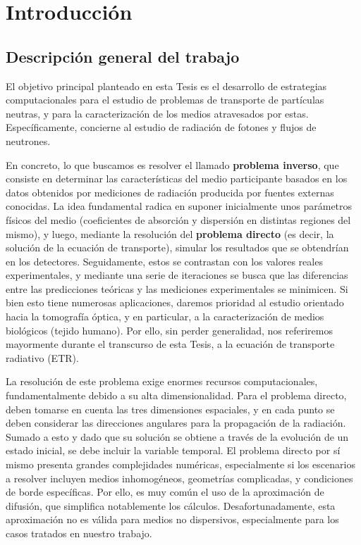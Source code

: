 
\pagestyle{fancy}
\lhead{\thepage}
\chapter{Introducción}
\vspace{0.01\textheight}


\clearpage \pagebreak  \section{Descripción general del trabajo}  

El objetivo principal planteado en esta Tesis es el desarrollo 
de estrategias computacionales para el 
estudio de problemas de transporte de partículas neutras, y para la 
caracterización de los medios atravesados por estas.
Específicamente, concierne al estudio de radiación de fotones y 
flujos de neutrones.

En concreto, lo que buscamos es resolver el llamado  
{\bf problema inverso}, que consiste en determinar las características 
del medio participante basados en los datos obtenidos por mediciones 
de radiación producida por fuentes externas conocidas.
La idea fundamental radica en suponer inicialmente unos parámetros 
físicos del medio (coeficientes de absorción y dispersión en distintas 
regiones del mismo), y luego, mediante la resolución del {\bf problema 
directo} (es decir, la solución de la ecuación de transporte), 
simular los resultados que se obtendrían en los detectores. 
Seguidamente, estos se contrastan con los valores reales experimentales, 
y mediante una serie de iteraciones se busca que las diferencias 
entre las predicciones teóricas y las mediciones experimentales 
se minimicen.
Si bien esto tiene numerosas aplicaciones, daremos prioridad al estudio 
orientado hacia la tomografía óptica, y en particular, a la 
caracterización de medios biológicos (tejido humano). 
Por ello, sin perder generalidad, nos referiremos mayormente 
durante el transcurso de esta Tesis, a la ecuación de transporte radiativo (ETR).

La resolución de este problema exige enormes recursos computacionales, 
fundamentalmente debido a su alta dimensionalidad.
Para el problema directo, deben tomarse en cuenta las tres dimensiones 
espaciales, y en cada punto se deben considerar las direcciones 
angulares para la propagación de la radiación. 
Sumado a esto y dado que su solución se obtiene a través de la 
evolución de un estado inicial, se debe incluir la variable temporal.
El problema directo por sí mismo presenta grandes complejidades 
numéricas, especialmente si los escenarios a resolver incluyen 
medios inhomogéneos, geometrías complicadas, y condiciones de 
borde específicas.
Por ello, es muy común el uso de la aproximación de difusión, 
que simplifica notablemente los cálculos. 
Desafortunadamente, esta aproximación no es válida para medios 
no dispersivos, especialmente para los casos tratados en nuestro trabajo.

